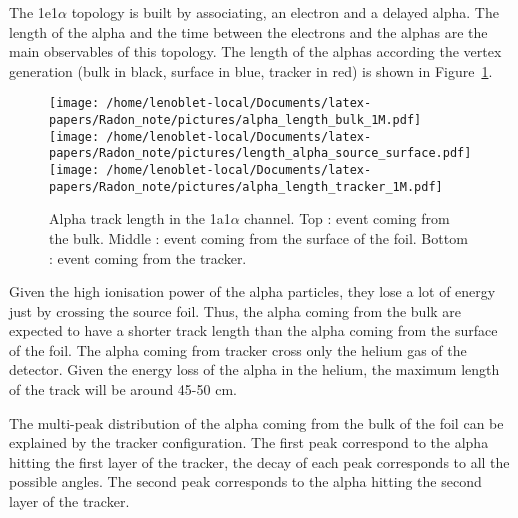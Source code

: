 \documentclass[main.tex]{subfiles}
\begin{document}
\bigskip


\noindent The 1e1$\alpha$ topology is built by associating, an electron and a delayed alpha. The length of the alpha and the time between the electrons and the alphas are the main observables of this topology. The length of the alphas according the vertex generation (bulk in black, surface in blue, tracker in red) is shown in Figure~\ref{alpha_length_source_selection}.


\begin{figure}[h!]
\begin{center}
\texttt{[image: /home/lenoblet-local/Documents/latex-papers/Radon\_note/pictures/alpha\_length\_bulk\_1M.pdf]}
\texttt{[image: /home/lenoblet-local/Documents/latex-papers/Radon\_note/pictures/length\_alpha\_source\_surface.pdf]}
\texttt{[image: /home/lenoblet-local/Documents/latex-papers/Radon\_note/pictures/alpha\_length\_tracker\_1M.pdf]}
\caption{Alpha track length in the 1a1$\alpha$ channel. Top : event coming from the bulk. Middle : event coming from the surface of the foil. Bottom : event coming from the tracker.}
\label{alpha_length_source_selection}
\end{center}
\end{figure}


\FloatBarrier


\noindent Given the high ionisation power of the alpha particles, they lose a lot of energy just by crossing the source foil. Thus, the alpha coming from the bulk are expected to have a shorter track length than the alpha coming from the surface of the foil. The alpha coming from tracker cross only the helium gas of the detector. Given the energy loss of the alpha in the helium, the maximum length of the track will be around 45-50 cm.

\bigskip

\noindent The multi-peak distribution of the alpha coming from the bulk of the foil can be explained by the tracker configuration. The first peak correspond to the alpha hitting the first layer of the tracker, the decay of each peak corresponds to all the possible angles. The second peak corresponds to the alpha hitting the second layer of the tracker.

\end{document}
